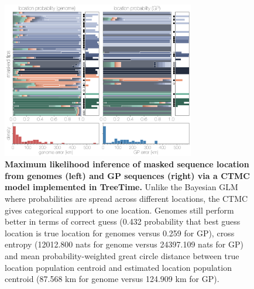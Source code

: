 \documentclass[11pt,oneside,letterpaper]{article}
\begin{document}
\begin{figure}[h]
 \centering
	\includegraphics[width=0.75\textwidth]{supp_figures/sfigX_treetimeLocations.png}
	\caption{\textbf{Maximum likelihood inference of masked sequence location from genomes (left) and GP sequences (right) via a CTMC model implemented in TreeTime.}
  Unlike the Bayesian GLM where probabilities are spread across different locations, the CTMC gives categorical support to one location.
  Genomes still perform better in terms of correct guess (0.432 probability that best guess location is true location for genomes versus 0.259 for GP), cross entropy (12012.800 nats for genome versus 24397.109 nats for GP) and mean probability-weighted great circle distance between true location population centroid and estimated location population centroid (87.568 km for genome versus 124.909 km for GP).
	}
	\label{TTlocations}
\end{figure}
\end{document}
